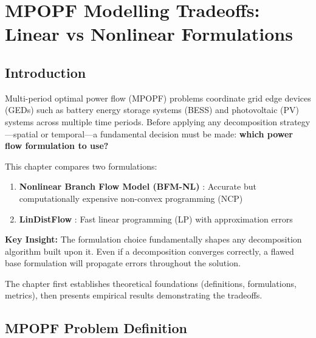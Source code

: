 
\section{MPOPF Modelling Tradeoffs: Linear vs Nonlinear Formulations}

\subsection{Introduction}

Multi-period optimal power flow (MPOPF) problems coordinate grid edge devices (GEDs) such as battery energy storage systems (BESS) and photovoltaic (PV) systems across multiple time periods. Before applying any decomposition strategy—spatial or temporal—a fundamental decision must be made: \textbf{which power flow formulation to use?}

This chapter compares two formulations:
\begin{enumerate}
    \item \textbf{Nonlinear Branch Flow Model (BFM-NL)} \cite{Farivar1}: Accurate but computationally expensive non-convex programming (NCP)
    \item \textbf{LinDistFlow} \cite{Gan}: Fast linear programming (LP) with approximation errors
\end{enumerate}

\textbf{Key Insight:} The formulation choice fundamentally shapes any decomposition algorithm built upon it. Even if a decomposition converges correctly, a flawed base formulation will propagate errors throughout the solution.

The chapter first establishes theoretical foundations (definitions, formulations, metrics), then presents empirical results demonstrating the tradeoffs.

\subsection{MPOPF Problem Definition}

